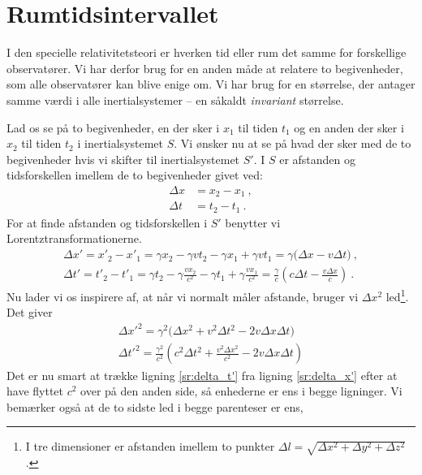 \section{Rumtidsintervallet}
I den specielle relativitetsteori er hverken tid eller rum det samme for forskellige observatører.
Vi har derfor brug for en anden måde at relatere to begivenheder, som alle observatører kan blive enige om.
Vi har brug for en størrelse, der antager samme værdi i alle inertialsystemer -- en såkaldt {\em invariant} størrelse.

Lad os se på to begivenheder, en der sker i $x_1$ til tiden $t_1$ og en anden der sker i $x_2$ til tiden $t_2$ i inertialsystemet $S$.
Vi ønsker nu at se på hvad der sker med de to begivenheder hvis vi skifter til inertialsystemet $S'$. I $S$ er afstanden og tidsforskellen imellem de to begivenheder givet ved:
\begin{subequations}
\begin{align}
    \Delta x&=x_2-x_1 \: , \\
    \Delta t&=t_2-t_1 \: .
\end{align}
\end{subequations}
For at finde afstanden og tidsforskellen i $S'$ benytter vi Lorentztransformationerne.
\begin{subequations}
\begin{gather}
    \Delta x' = x'_2-x'_1=\gamma x_2-\gamma vt_2-\gamma x_1+\gamma v t_1=\gamma \Big(\Delta x- v\Delta t\Big) \: , \\
    \Delta t' = t'_2-t'_1=\gamma t_2-\gamma \frac{vx_2}{c^2}-\gamma t_1+\gamma \frac{vx_1}{c^2} = \frac{\gamma}{c} \left(c\Delta t - \frac{v\Delta x}{c} \right) \: .
\end{gather}
\end{subequations}
Nu lader vi os inspirere af, at når vi normalt måler afstande, bruger vi $\Delta x^2$ led\footnote{I tre dimensioner er afstanden imellem to punkter $\Delta l=\sqrt{\Delta x^2+\Delta y^2+\Delta z^2}$.}.
Det giver
\begin{subequations}
\begin{gather}
    \Delta x'^2=\gamma^2\Big(\Delta x^2+v^2\Delta t^2-2v\Delta x\Delta t\Big) \label{sr:delta_x'}\\
    \Delta t'^2 = \frac{\gamma^2}{c^2} \left(c^2\Delta t^2+\frac{v^2\Delta x^2}{c^2}-2v\Delta x\Delta t\right) \label{sr:delta_t'}
\end{gather}
\end{subequations}
Det er nu smart at trække ligning \eqref{sr:delta_t'} fra ligning \eqref{sr:delta_x'} efter at have flyttet $c^2$ over på den anden side, så enhederne er ens i begge ligninger. Vi bemærker også at de to sidste led i begge parenteser er ens, %
